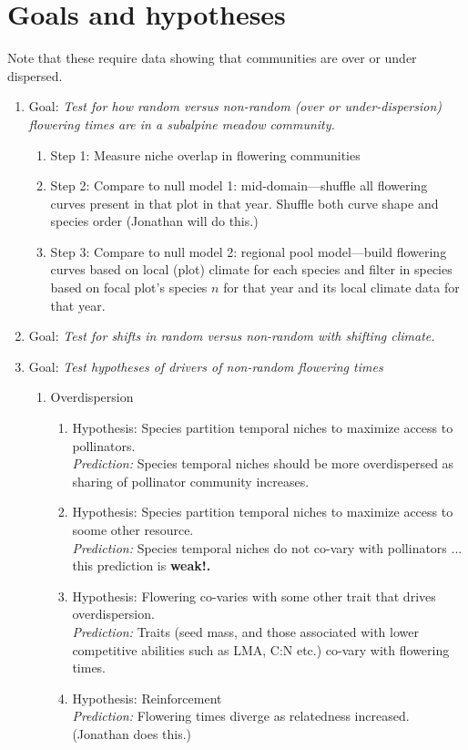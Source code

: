 \documentclass[11pt,a4paper]{article}
\begin{document}
\section{Goals and hypotheses}
 Note that these require data showing that communities are over or under dispersed.
\begin{enumerate}
\item Goal: \emph{Test for how random versus non-random (over or under-dispersion) flowering times are in a subalpine meadow community.}
\begin{enumerate}
\item Step 1: Measure niche overlap in flowering communities
\item Step 2: Compare to null model 1: mid-domain---shuffle all flowering curves present in that plot in that year. Shuffle both curve shape and species order (Jonathan will do this.)
\item Step 3: Compare to null model 2: regional pool model---build flowering curves based on local (plot) climate for each species and filter in species based on focal plot's species $n$ for that year and its local climate data for that year. 
\end{enumerate}
\item Goal: \emph{Test for shifts in random versus non-random with shifting climate.}
\item Goal: \emph{Test hypotheses of drivers of non-random flowering times}
\begin{enumerate}
\item Overdispersion
\begin{enumerate}
\item Hypothesis: Species partition temporal niches to maximize access to pollinators.\\ \emph{Prediction:} Species temporal niches should be more overdispersed as sharing of pollinator community increases.
\item Hypothesis: Species partition temporal niches to maximize access to soome other resource.\\ \emph{Prediction:} Species temporal niches do not co-vary with pollinators ... this prediction is {\bf weak!.}
\item Hypothesis: Flowering co-varies with some other trait that drives overdispersion.\\ \emph{Prediction:} Traits (seed mass, and those associated with lower competitive abilities such as LMA, C:N etc.) co-vary with flowering times. 
\item Hypothesis: Reinforcement \\ \emph{Prediction:} Flowering times diverge as relatedness increased. (Jonathan does this.) 

\end{enumerate}
\end{enumerate}
\end{enumerate}
\end{document}
